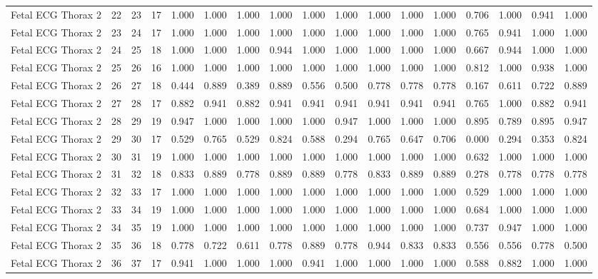 \begin{longtable}{lllllllllllllllll}
Fetal ECG Thorax 2 & 22 & 23 & 17 & 1.000 & 1.000 & 1.000 & 1.000 & 1.000 & 1.000 & 1.000 & 1.000 & 1.000 & 0.706 & 1.000 & 0.941 & 1.000 \\
Fetal ECG Thorax 2 & 23 & 24 & 17 & 1.000 & 1.000 & 1.000 & 1.000 & 1.000 & 1.000 & 1.000 & 1.000 & 1.000 & 0.765 & 0.941 & 1.000 & 1.000 \\
Fetal ECG Thorax 2 & 24 & 25 & 18 & 1.000 & 1.000 & 1.000 & 0.944 & 1.000 & 1.000 & 1.000 & 1.000 & 1.000 & 0.667 & 0.944 & 1.000 & 1.000 \\
Fetal ECG Thorax 2 & 25 & 26 & 16 & 1.000 & 1.000 & 1.000 & 1.000 & 1.000 & 1.000 & 1.000 & 1.000 & 1.000 & 0.812 & 1.000 & 0.938 & 1.000 \\
Fetal ECG Thorax 2 & 26 & 27 & 18 & 0.444 & 0.889 & 0.389 & 0.889 & 0.556 & 0.500 & 0.778 & 0.778 & 0.778 & 0.167 & 0.611 & 0.722 & 0.889 \\
Fetal ECG Thorax 2 & 27 & 28 & 17 & 0.882 & 0.941 & 0.882 & 0.941 & 0.941 & 0.941 & 0.941 & 0.941 & 0.941 & 0.765 & 1.000 & 0.882 & 0.941 \\
Fetal ECG Thorax 2 & 28 & 29 & 19 & 0.947 & 1.000 & 1.000 & 1.000 & 1.000 & 0.947 & 1.000 & 1.000 & 1.000 & 0.895 & 0.789 & 0.895 & 0.947 \\
Fetal ECG Thorax 2 & 29 & 30 & 17 & 0.529 & 0.765 & 0.529 & 0.824 & 0.588 & 0.294 & 0.765 & 0.647 & 0.706 & 0.000 & 0.294 & 0.353 & 0.824 \\
Fetal ECG Thorax 2 & 30 & 31 & 19 & 1.000 & 1.000 & 1.000 & 1.000 & 1.000 & 1.000 & 1.000 & 1.000 & 1.000 & 0.632 & 1.000 & 1.000 & 1.000 \\
Fetal ECG Thorax 2 & 31 & 32 & 18 & 0.833 & 0.889 & 0.778 & 0.889 & 0.889 & 0.778 & 0.833 & 0.889 & 0.889 & 0.278 & 0.778 & 0.778 & 0.778 \\
Fetal ECG Thorax 2 & 32 & 33 & 17 & 1.000 & 1.000 & 1.000 & 1.000 & 1.000 & 1.000 & 1.000 & 1.000 & 1.000 & 0.529 & 1.000 & 1.000 & 1.000 \\
Fetal ECG Thorax 2 & 33 & 34 & 19 & 1.000 & 1.000 & 1.000 & 1.000 & 1.000 & 1.000 & 1.000 & 1.000 & 1.000 & 0.684 & 1.000 & 1.000 & 1.000 \\
Fetal ECG Thorax 2 & 34 & 35 & 19 & 1.000 & 1.000 & 1.000 & 1.000 & 1.000 & 1.000 & 1.000 & 1.000 & 1.000 & 0.737 & 0.947 & 1.000 & 1.000 \\
Fetal ECG Thorax 2 & 35 & 36 & 18 & 0.778 & 0.722 & 0.611 & 0.778 & 0.889 & 0.778 & 0.944 & 0.833 & 0.833 & 0.556 & 0.556 & 0.778 & 0.500 \\
Fetal ECG Thorax 2 & 36 & 37 & 17 & 0.941 & 1.000 & 1.000 & 1.000 & 0.941 & 1.000 & 1.000 & 1.000 & 1.000 & 0.588 & 0.882 & 1.000 & 1.000 \\

\end{longtable}
